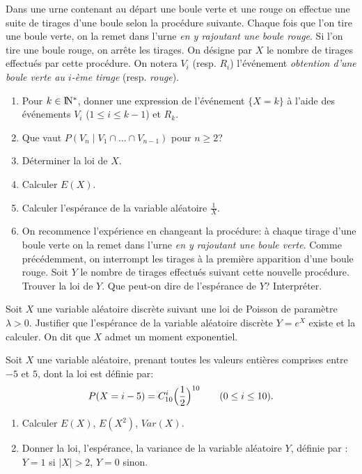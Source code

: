 \documentclass[a4paper,12pt,reqno]{amsart}
\begin{document}
\begin{exo}

  Dans une urne contenant au départ une boule verte et une rouge on effectue une suite de tirages d'une boule selon la procédure suivante. Chaque fois que l'on tire une boule verte, on la remet dans l'urne \emph{en y rajoutant une boule rouge}. Si l'on tire une boule rouge, on arrête les tirages. On désigne par $X$ le nombre de tirages effectués par cette procédure. On notera $V_i$ (resp. $R_i$) l'événement \emph{obtention d'une boule verte au $i$-ème tirage} (resp. \emph{rouge}).

  \begin{enumerate}
    \item Pour $k\in\rm I\!N^{\ast}$, donner une expression de l'événement $\{X=k\}$ à l'aide des événements $V_i$ ($1\leq i\leq k-1$) et $R_k$.
    \item Que vaut $P(V_n\mid V_1\cap\ldots\cap V_{n-1})$ pour $n\geq 2$?
    \item Déterminer la loi de $X$.
    \item Calculer $E(X)$.
    \item Calculer l'espérance de la variable aléatoire $\frac{1}{X}$.
    \item On recommence l'expérience en changeant la procédure: à chaque tirage d'une boule verte on la remet dans l'urne \emph{en y rajoutant une boule verte}. Comme précédemment, on interrompt les tirages à la première apparition d'une boule rouge. Soit $Y$ le nombre de tirages effectués suivant cette nouvelle procédure. Trouver la loi de $Y$. Que peut-on dire de l'espérance de $Y$? Interpréter.
  \end{enumerate}

\end{exo}

\begin{exo}

  Soit $X$ une variable aléatoire discrète suivant une loi de Poisson de paramètre $\lambda>0$. Justifier que l'espérance de la variable aléatoire discrète $Y=e^X$ existe  et la calculer. On dit que $X$ admet un moment exponentiel.

\end{exo}

\begin{exo}

  Soit $X$ une variable aléatoire, prenant toutes les valeurs entières comprises entre $-5$ et $5$, dont la loi est définie par:
    $$
    P(X=i-5)=C_{10}^i\Bigl(\frac{1}{2}\Bigr)^{10}\qquad (0\leq i\leq 10).
    $$

  \begin{enumerate}
    \item Calculer $E(X)$, $E(X^2)$, $Var(X)$.
    \item Donner la loi, l'espérance, la variance de la variable aléatoire
    $Y$, définie par : $Y=1$ si $|X| > 2$, $Y=0$ sinon.
  \end{enumerate}

\end{exo}
\end{document}
